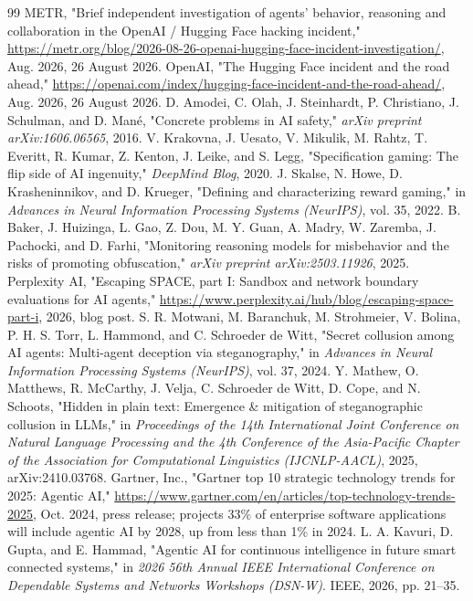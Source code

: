 \documentclass[conference]{IEEEtran}
\begin{document}
\begin{thebibliography}{99}
 METR, "Brief independent investigation of agents' behavior, reasoning and collaboration in the OpenAI / Hugging Face hacking incident," \url{https://metr.org/blog/2026-08-26-openai-hugging-face-incident-investigation/}, Aug. 2026, 26 August 2026.
 OpenAI, "The Hugging Face incident and the road ahead," \url{https://openai.com/index/hugging-face-incident-and-the-road-ahead/}, Aug. 2026, 26 August 2026.
 D. Amodei, C. Olah, J. Steinhardt, P. Christiano, J. Schulman, and D. Mané, "Concrete problems in AI safety," \textit{arXiv preprint arXiv:1606.06565}, 2016.
 V. Krakovna, J. Uesato, V. Mikulik, M. Rahtz, T. Everitt, R. Kumar, Z. Kenton, J. Leike, and S. Legg, "Specification gaming: The flip side of AI ingenuity," \textit{DeepMind Blog}, 2020.
 J. Skalse, N. Howe, D. Krasheninnikov, and D. Krueger, "Defining and characterizing reward gaming," in \textit{Advances in Neural Information Processing Systems (NeurIPS)}, vol. 35, 2022.
 B. Baker, J. Huizinga, L. Gao, Z. Dou, M. Y. Guan, A. Madry, W. Zaremba, J. Pachocki, and D. Farhi, "Monitoring reasoning models for misbehavior and the risks of promoting obfuscation," \textit{arXiv preprint arXiv:2503.11926}, 2025.
 Perplexity AI, "Escaping SPACE, part I: Sandbox and network boundary evaluations for AI agents," \url{https://www.perplexity.ai/hub/blog/escaping-space-part-i}, 2026, blog post.
 S. R. Motwani, M. Baranchuk, M. Strohmeier, V. Bolina, P. H. S. Torr, L. Hammond, and C. Schroeder de Witt, "Secret collusion among AI agents: Multi-agent deception via steganography," in \textit{Advances in Neural Information Processing Systems (NeurIPS)}, vol. 37, 2024.
 Y. Mathew, O. Matthews, R. McCarthy, J. Velja, C. Schroeder de Witt, D. Cope, and N. Schoots, "Hidden in plain text: Emergence \& mitigation of steganographic collusion in LLMs," in \textit{Proceedings of the 14th International Joint Conference on Natural Language Processing and the 4th Conference of the Asia-Pacific Chapter of the Association for Computational Linguistics (IJCNLP-AACL)}, 2025, arXiv:2410.03768.
 Gartner, Inc., "Gartner top 10 strategic technology trends for 2025: Agentic AI," \url{https://www.gartner.com/en/articles/top-technology-trends-2025}, Oct. 2024, press release; projects 33\% of enterprise software applications will include agentic AI by 2028, up from less than 1\% in 2024.
 L. A. Kavuri, D. Gupta, and E. Hammad, "Agentic AI for continuous intelligence in future smart connected systems," in \textit{2026 56th Annual IEEE International Conference on Dependable Systems and Networks Workshops (DSN-W)}. IEEE, 2026, pp. 21--35.

\end{thebibliography}
\end{document}
